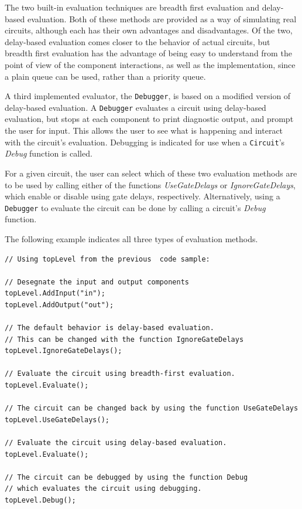 \documentclass{article}
\newcommand{\ClassName}[1]{\texttt{#1}}
\newcommand{\FunctionName}[1]{\textit{#1}}
\begin{document}
The two built-in evaluation techniques are breadth first evaluation and delay-based evaluation. Both of these methods are provided as a way of simulating real circuits, although each has their own advantages and disadvantages. Of the two, delay-based evaluation comes closer to the behavior of actual circuits, but breadth first evaluation has the advantage of being easy to understand from the point of view of the component interactions, as well as the implementation, since a plain queue can be used, rather than a priority queue.

A third implemented evaluator, the \ClassName{Debugger}, is based on a modified version of delay-based evaluation. A \ClassName{Debugger} evaluates a circuit using delay-based evaluation, but stops at each component to print diagnostic output, and prompt the user for input. This allows the user to see what is happening and interact with the circuit’s evaluation. Debugging is indicated for use when a \ClassName{Circuit}'s \FunctionName{Debug} function is called.

For a given circuit, the user can select which of these two evaluation methods are to be used by calling either of the functions \FunctionName{UseGateDelays} or \FunctionName{IgnoreGateDelays}, which enable or disable using gate delays, respectively. Alternatively, using a \ClassName{Debugger} to evaluate the circuit can be done by calling a circuit's \FunctionName{Debug} function.

The following example indicates all three types of evaluation methods.

\begin{lstlisting}
// Using topLevel from the previous  code sample:

// Desegnate the input and output components
topLevel.AddInput("in");
topLevel.AddOutput("out");

// The default behavior is delay-based evaluation.
// This can be changed with the function IgnoreGateDelays
topLevel.IgnoreGateDelays();

// Evaluate the circuit using breadth-first evaluation.
topLevel.Evaluate();

// The circuit can be changed back by using the function UseGateDelays
topLevel.UseGateDelays();

// Evaluate the circuit using delay-based evaluation.
topLevel.Evaluate();

// The circuit can be debugged by using the function Debug
// which evaluates the circuit using debugging.
topLevel.Debug();
\end{lstlisting}
\end{document}
